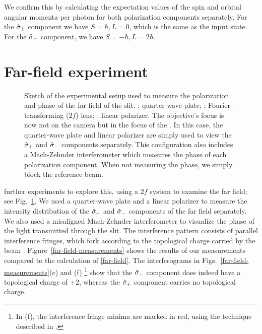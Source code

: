 We confirm this by calculating the expectation values of the spin and orbital angular momenta per photon for both polarization components separately.
For the $\hat{\mathbf{\sigma}}_+$ component we have $S = \hbar, L = 0$, which is the same as the input state.
For the $\hat{\mathbf{\sigma}}_-$ component, we have $S = -\hbar, L = 2\hbar$.

\section{Far-field experiment}

\begin{figure}[tb]
  \caption{Sketch of the experimental setup used to measure the polarization and phase of the far field of the slit. : quarter wave plate; : Fourier-transforming ($2f$) lens; : linear polarizer. The objective's focus is now not on the camera but in the focus of the . In this case, the quarter-wave plate and linear polarizer are simply used to view the $\hat{\mathbf{\sigma}}_{+}$ and $\hat{\mathbf{\sigma}}_{-}$ components separately. This configuration also includes a Mach-Zehnder interferometer which measures the phase of each polarization component.
  When not measuring the phase, we simply block the reference beam.}
  \label{soc:fig:setup-farfield}
\end{figure}
%
 further experiments to explore this, using a $2f$ system to examine the far field; see Fig.~\ref{soc:fig:setup-farfield}. We used a quarter-wave plate and a linear polarizer to measure the intensity distribution of the $\hat{\mathbf{\sigma}}_{+}$ and $\hat{\mathbf{\sigma}}_{-}$ components of the far field separately. We also used a misaligned Mach-Zehn\-der interferometer to visualize the phase of the light transmitted through the slit. The interference pattern consists of parallel interference fringes, which fork according to the topological charge carried by the beam \cite{Basistiy1995}. Figure~\ref{far-field-measurements} shows the results of our measurements compared to the calculation of \eqref{far-field}. The interferograms in Figs.~\ref{far-field-measurements}(c) and (f)%
\footnote{In (f), the interference fringe minima are marked in red, using the technique described in \textcite{Cai2003}.}
show that the $\hat{\mathbf{\sigma}}_{-}$ component does indeed have a topological charge of +2, whereas the $\hat{\mathbf{\sigma}}_{+}$ component carries no topological charge.
%
